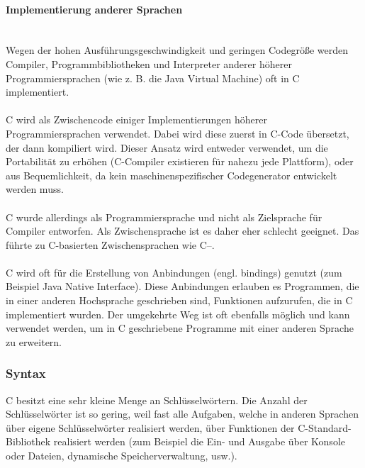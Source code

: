 \paragraph{Implementierung anderer Sprachen}
\ \\
Wegen der hohen Ausführungsgeschwindigkeit und geringen Codegröße werden Compiler, Programmbibliotheken und Interpreter anderer höherer Programmiersprachen (wie z. B. die Java Virtual Machine) oft in C implementiert.\\
\\
C wird als Zwischencode einiger Implementierungen höherer Programmiersprachen verwendet. Dabei wird diese zuerst in C-Code übersetzt, der dann kompiliert wird. Dieser Ansatz wird entweder verwendet, um die Portabilität zu erhöhen (C-Compiler existieren für nahezu jede Plattform), oder aus Bequemlichkeit, da kein maschinenspezifischer Codegenerator entwickelt werden muss.\\
\\
C wurde allerdings als Programmiersprache und nicht als Zielsprache für Compiler entworfen. Als Zwischensprache ist es daher eher schlecht geeignet. Das führte zu C-basierten Zwischensprachen wie C--.\\
\\
C wird oft für die Erstellung von Anbindungen (engl. bindings) genutzt (zum Beispiel Java Native Interface). Diese Anbindungen erlauben es Programmen, die in einer anderen Hochsprache geschrieben sind, Funktionen aufzurufen, die in C implementiert wurden. Der umgekehrte Weg ist oft ebenfalls möglich und kann verwendet werden, um in C geschriebene Programme mit einer anderen Sprache zu erweitern.\\

\subsubsection{Syntax}

C besitzt eine sehr kleine Menge an Schlüsselwörtern. Die Anzahl der Schlüsselwörter ist so gering, weil fast alle Aufgaben, welche in anderen Sprachen über eigene Schlüsselwörter realisiert werden, über Funktionen der C-Standard-Bibliothek realisiert werden (zum Beispiel die Ein- und Ausgabe über Konsole oder Dateien, dynamische Speicherverwaltung, usw.).\\


